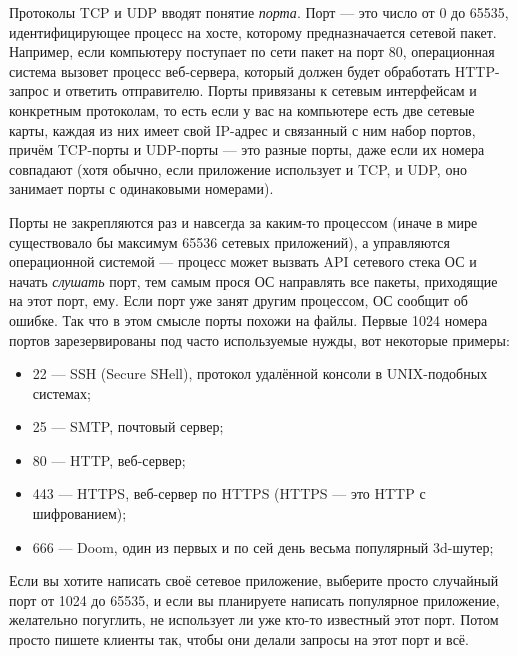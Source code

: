\documentclass{../../text-style}
\begin{document}
Протоколы TCP и UDP вводят понятие \textit{порта}. Порт --- это число от 0 до 65535, идентифицирующее процесс на хосте, которому предназначается сетевой пакет. Например, если компьютеру поступает по сети пакет на порт 80, операционная система вызовет процесс веб-сервера, который должен будет обработать HTTP-запрос и ответить отправителю. Порты привязаны к сетевым интерфейсам и конкретным протоколам, то есть если у вас на компьютере есть две сетевые карты, каждая из них имеет свой IP-адрес и связанный с ним набор портов, причём TCP-порты и UDP-порты --- это разные порты, даже если их номера совпадают (хотя обычно, если приложение использует и TCP, и UDP, оно занимает порты с одинаковыми номерами).

Порты не закрепляются раз и навсегда за каким-то процессом (иначе в мире существовало бы максимум 65536 сетевых приложений), а управляются операционной системой --- процесс может вызвать API сетевого стека ОС и начать \textit{слушать} порт, тем самым прося ОС направлять все пакеты, приходящие на этот порт, ему. Если порт уже занят другим процессом, ОС сообщит об ошибке. Так что в этом смысле порты похожи на файлы. Первые 1024 номера портов зарезервированы под часто используемые нужды, вот некоторые примеры:

\begin{itemize}
    \item 22 --- SSH (Secure SHell), протокол удалённой консоли в UNIX-подобных системах;
    \item 25 --- SMTP, почтовый сервер;
    \item 80 --- HTTP, веб-сервер;
    \item 443 --- HTTPS, веб-сервер по HTTPS (HTTPS --- это HTTP с шифрованием);
    \item 666 --- Doom, один из первых и по сей день весьма популярный 3d-шутер;
\end{itemize}

Если вы хотите написать своё сетевое приложение, выберите просто случайный порт от 1024 до 65535, и если вы планируете написать популярное приложение, желательно погуглить, не использует ли уже кто-то известный этот порт. Потом просто пишете клиенты так, чтобы они делали запросы на этот порт и всё.
\end{document}
